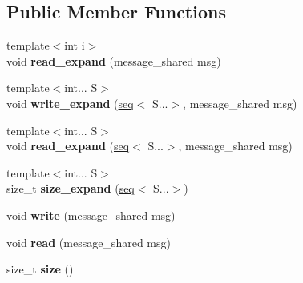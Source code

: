 \subsection*{\-Public \-Member \-Functions}
\begin{DoxyCompactItemize}
\item 
\hypertarget{classgal_1_1network_1_1serial__ext_a3351ca1d29f0996e8e0d53f297bd6d2a}{{\footnotesize template$<$int i$>$ }\\void {\bfseries read\-\_\-expand} (message\-\_\-shared msg)}\label{classgal_1_1network_1_1serial__ext_a3351ca1d29f0996e8e0d53f297bd6d2a}

\item 
\hypertarget{classgal_1_1network_1_1serial__ext_a809b3aaf3e7b230917ecdba03478394f}{{\footnotesize template$<$int... \-S$>$ }\\void {\bfseries write\-\_\-expand} (\hyperlink{structseq}{seq}$<$ \-S...$>$, message\-\_\-shared msg)}\label{classgal_1_1network_1_1serial__ext_a809b3aaf3e7b230917ecdba03478394f}

\item 
\hypertarget{classgal_1_1network_1_1serial__ext_a4390bf410c73d1248d570711a7c7b23f}{{\footnotesize template$<$int... \-S$>$ }\\void {\bfseries read\-\_\-expand} (\hyperlink{structseq}{seq}$<$ \-S...$>$, message\-\_\-shared msg)}\label{classgal_1_1network_1_1serial__ext_a4390bf410c73d1248d570711a7c7b23f}

\item 
\hypertarget{classgal_1_1network_1_1serial__ext_a28603c0e7dbdb1d1e766ed922889886e}{{\footnotesize template$<$int... \-S$>$ }\\size\-\_\-t {\bfseries size\-\_\-expand} (\hyperlink{structseq}{seq}$<$ \-S...$>$)}\label{classgal_1_1network_1_1serial__ext_a28603c0e7dbdb1d1e766ed922889886e}

\item 
\hypertarget{classgal_1_1network_1_1serial__ext_a492710a00e65fa43ded36916dbf1ea28}{void {\bfseries write} (message\-\_\-shared msg)}\label{classgal_1_1network_1_1serial__ext_a492710a00e65fa43ded36916dbf1ea28}

\item 
\hypertarget{classgal_1_1network_1_1serial__ext_a06038a5f1aadd0fe73e966ceeacbc685}{void {\bfseries read} (message\-\_\-shared msg)}\label{classgal_1_1network_1_1serial__ext_a06038a5f1aadd0fe73e966ceeacbc685}

\item 
\hypertarget{classgal_1_1network_1_1serial__ext_a78848aa7718b88c624070e01e583bdec}{size\-\_\-t {\bfseries size} ()}\label{classgal_1_1network_1_1serial__ext_a78848aa7718b88c624070e01e583bdec}

\end{DoxyCompactItemize}
